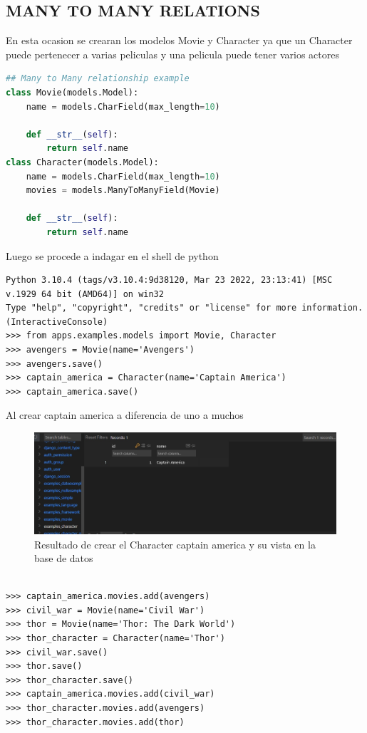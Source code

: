 \documentclass{article}
\begin{document}
\subsection{MANY TO MANY RELATIONS}
En esta ocasion se crearan los modelos Movie y Character ya que un Character puede pertenecer a varias peliculas y una pelicula puede tener varios actores

\begin{lstlisting}[language=Python, caption=Modelos de ejemplo de ManyToManyRelations]
## Many to Many relationship example
class Movie(models.Model):
    name = models.CharField(max_length=10)

    def __str__(self):
        return self.name
class Character(models.Model):
    name = models.CharField(max_length=10)
    movies = models.ManyToManyField(Movie)
    
    def __str__(self):
        return self.name
\end{lstlisting}

Luego se procede a indagar en el shell de python

\begin{lstlisting}
Python 3.10.4 (tags/v3.10.4:9d38120, Mar 23 2022, 23:13:41) [MSC v.1929 64 bit (AMD64)] on win32
Type "help", "copyright", "credits" or "license" for more information.
(InteractiveConsole)
>>> from apps.examples.models import Movie, Character
>>> avengers = Movie(name='Avengers') 
>>> avengers.save()
>>> captain_america = Character(name='Captain America')
>>> captain_america.save()
\end{lstlisting}

Al crear captain america a diferencia de uno a muchos 
\newpage
\begin{figure}[!h]
    \centering
    \includegraphics[scale=1.5]{img/2.jpg}
    \caption{Resultado de crear el Character captain america y su vista en la base de datos}
    \label{fig:enter-label}
\end{figure}


\begin{lstlisting}

>>> captain_america.movies.add(avengers)
>>> civil_war = Movie(name='Civil War')
>>> thor = Movie(name='Thor: The Dark World')
>>> thor_character = Character(name='Thor')
>>> civil_war.save()
>>> thor.save()
>>> thor_character.save()
>>> captain_america.movies.add(civil_war)
>>> thor_character.movies.add(avengers)
>>> thor_character.movies.add(thor)
\end{lstlisting}
\end{document}
